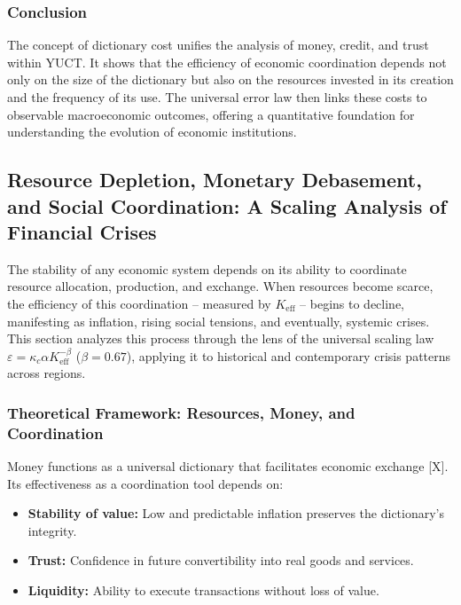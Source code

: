 \documentclass[11pt,a4paper]{article}
\theoremstyle{remark}
\begin{document}
	
	
	\subsubsection{Conclusion}
	The concept of dictionary cost unifies the analysis of money, credit, and trust within YUCT. It shows that the efficiency of economic coordination depends not only on the size of the dictionary but also on the resources invested in its creation and the frequency of its use. The universal error law then links these costs to observable macroeconomic outcomes, offering a quantitative foundation for understanding the evolution of economic institutions.
	
	\subsection{Resource Depletion, Monetary Debasement, and Social Coordination: A Scaling Analysis of Financial Crises}
	\label{sec:crisis_scaling}
	
	The stability of any economic system depends on its ability to coordinate resource allocation, production, and exchange. When resources become scarce, the efficiency of this coordination – measured by \(K_{\text{eff}}\) – begins to decline, manifesting as inflation, rising social tensions, and eventually, systemic crises. This section analyzes this process through the lens of the universal scaling law \(\varepsilon = \kappa_c \alpha K_{\text{eff}}^{-\beta}\) (\(\beta = 0.67\)), applying it to historical and contemporary crisis patterns across regions.
	
	\subsubsection{Theoretical Framework: Resources, Money, and Coordination}
	Money functions as a universal dictionary that facilitates economic exchange [X]. Its effectiveness as a coordination tool depends on:
	\begin{itemize}
		\item \textbf{Stability of value:} Low and predictable inflation preserves the dictionary's integrity.
		\item \textbf{Trust:} Confidence in future convertibility into real goods and services.
		\item \textbf{Liquidity:} Ability to execute transactions without loss of value.
	\end{itemize}
	
\end{document}
